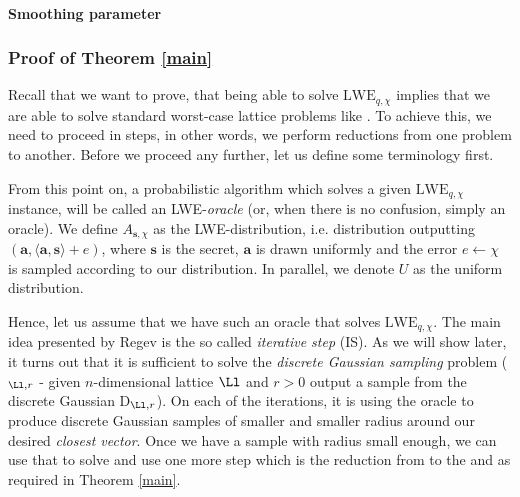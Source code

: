 \paragraph{Smoothing parameter}

\subsubsection{Proof of Theorem \ref{main}}
Recall that we want to prove, that being able to solve $\text{LWE}_{q, \chi}$ implies that we are able to solve standard worst-case lattice problems like . To achieve this, we need to proceed in steps, in other words, we perform reductions from one problem to another. Before we proceed any further, let us define some terminology first.

From this point on, a probabilistic algorithm which solves a given $\text{LWE}_{q, \chi}$ instance, will be called an LWE-\textit{oracle} (or, when there is no confusion, simply an oracle). We define $A_{\bm{s},\chi}$ as the LWE-distribution, i.e. distribution outputting $(\bm{a}, \langle \bm{a}, \bm{s} \rangle + e)$, where $\bm{s}$ is the secret, $\bm{a}$ is drawn uniformly and the error $e \leftarrow \chi$ is sampled according to our distribution. In parallel, we denote $U$ as the uniform distribution.

Hence, let us assume that we have such an oracle that solves $\text{LWE}_{q, \chi}$. The main idea presented by Regev is the so called \textit{iterative step} (IS). As we will show later, it turns out that it is sufficient to solve the \textit{discrete Gaussian sampling} problem ($_{\Ll, r}$ - given $n$-dimensional lattice $\Ll$ and $r>0$ output a sample from the discrete Gaussian D$_{\Ll, r}$). 
On each of the iterations, it is using the oracle to produce discrete Gaussian samples of smaller and smaller radius around our desired \textit{closest vector}. Once we have a sample with radius small enough, we can use that to solve  and use one more step which is the reduction from  to the  and  as required in Theorem \ref{main}.

\begin{center}
\end{center}

